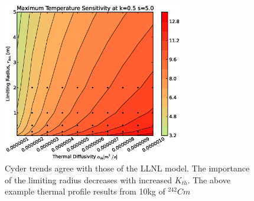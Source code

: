 \begin{figure}[htbp!]
\begin{center}
\includegraphics[width=0.7\textwidth]{./chapters/demonstration/diffusivity/ar.eps}
\end{center}
\caption[$\alpha_{th}$ vs. $r_{lim}$ Sensitivity in Cyder]
{Cyder trends agree with 
those of the LLNL model. The importance of the limiting radius decreases with 
increased $K_{th}$. The above example thermal profile results from 10kg of 
$^{242}Cm$}
\label{fig:ak}
\end{figure}
